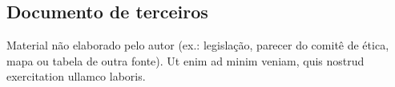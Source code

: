 \documentclass[mestrado,qualificacao]{packages/ppg}
\begin{document}
\begin{anexosenv}
    \chapter{Documento de terceiros}
    \label{anx:documento}
    Material não elaborado pelo autor (ex.: legislação, parecer do comitê de
    ética, mapa ou tabela de outra fonte). Ut enim ad minim veniam, quis nostrud
    exercitation ullamco laboris.
\end{anexosenv}
\end{document}
